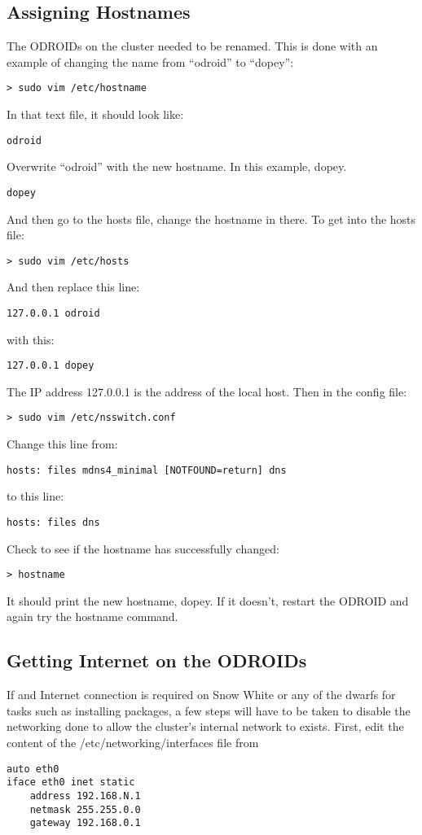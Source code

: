 \subsection{Assigning Hostnames}
The ODROIDs on the cluster needed to be renamed. This is done with an example of changing the name from ``odroid'' to ``dopey'':
\begin{lstlisting}
> sudo vim /etc/hostname
\end{lstlisting}
In that text file, it should look like:
\begin{lstlisting}
odroid
\end{lstlisting}
Overwrite ``odroid'' with the new hostname. In this example, dopey.
\begin{lstlisting}
dopey
\end{lstlisting}
And then go to the hosts file, change the hostname in there. To get into the hosts file:
\begin{lstlisting}
> sudo vim /etc/hosts
\end{lstlisting}
And then replace this line:
\begin{lstlisting}
127.0.0.1 odroid
\end{lstlisting} 
with this:
\begin{lstlisting}
127.0.0.1 dopey
\end{lstlisting}
The IP address 127.0.0.1 is the address of the local host. Then in the config file:
\begin{lstlisting}
> sudo vim /etc/nsswitch.conf
\end{lstlisting}
Change this line from:
\begin{lstlisting}
hosts: files mdns4_minimal [NOTFOUND=return] dns
\end{lstlisting}
to this line:
\begin{lstlisting}
hosts: files dns
\end{lstlisting}
Check to see if the hostname has successfully changed:
\begin{lstlisting}
> hostname
\end{lstlisting}
It should print the new hostname, dopey. If it doesn't, restart the ODROID and again try the hostname command.

\subsection{Getting Internet on the ODROIDs}
If and Internet connection is required on Snow White or any of the dwarfs for tasks such as installing packages, a few steps will have to be taken to disable the networking done to allow the cluster's internal network to exists. First, edit the content of the /etc/networking/interfaces file from
\begin{lstlisting}
auto eth0
iface eth0 inet static
	address 192.168.N.1
	netmask 255.255.0.0
	gateway 192.168.0.1
\end{lstlisting}

